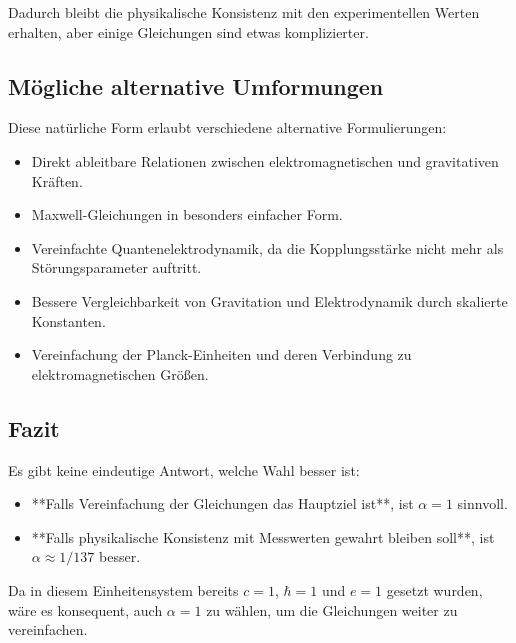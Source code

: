 \documentclass{article}
\begin{document}
	Dadurch bleibt die physikalische Konsistenz mit den experimentellen Werten erhalten, aber einige Gleichungen sind etwas komplizierter.
	
	\subsection*{Mögliche alternative Umformungen}
	
	Diese natürliche Form erlaubt verschiedene alternative Formulierungen:
	
	\begin{itemize}
		\item Direkt ableitbare Relationen zwischen elektromagnetischen und gravitativen Kräften.
		\item Maxwell-Gleichungen in besonders einfacher Form.
		\item Vereinfachte Quantenelektrodynamik, da die Kopplungsstärke nicht mehr als Störungsparameter auftritt.
		\item Bessere Vergleichbarkeit von Gravitation und Elektrodynamik durch skalierte Konstanten.
		\item Vereinfachung der Planck-Einheiten und deren Verbindung zu elektromagnetischen Größen.
	\end{itemize}
	
	\subsection*{Fazit}
	
	Es gibt keine eindeutige Antwort, welche Wahl besser ist:
	
	\begin{itemize}
		\item **Falls Vereinfachung der Gleichungen das Hauptziel ist**, ist \( \alpha = 1 \) sinnvoll.
		\item **Falls physikalische Konsistenz mit Messwerten gewahrt bleiben soll**, ist \( \alpha \approx 1/137 \) besser.
	\end{itemize}
	
	Da in diesem Einheitensystem bereits \( c = 1 \), \( \hbar = 1 \) und \( e = 1 \) gesetzt wurden, wäre es konsequent, auch \( \alpha = 1 \) zu wählen, um die Gleichungen weiter zu vereinfachen.
	
\end{document}
